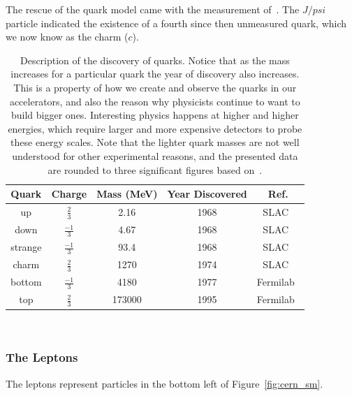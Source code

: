 The rescue of the quark model came with the measurement of~\citep{Jpsi_PhysRevLett.33.1404}.
The $J/psi$ particle indicated the existence of a fourth since then unmeasured quark, which we now know as the charm ($c$).

\begin{table}
\begin{center}
\begin{tabular}{||c c c c c||}
 \hline
 Quark & Charge & Mass (MeV) & Year Discovered & Ref.\\ [0.5ex]
 \hline\hline
 up & $\frac{2}{3}$ & 2.16 & 1968 & SLAC~\citep{1969PhRvL..23..930B, 1969PhRvL..23..935B} \\
 \hline
 down & $\frac{-1}{3}$ & 4.67 & 1968 & SLAC~\citep{1969PhRvL..23..930B, 1969PhRvL..23..935B} \\
 \hline
 strange & $\frac{-1}{3}$ & 93.4 & 1968 & SLAC~\citep{1969PhRvL..23..930B, 1969PhRvL..23..935B} \\
 \hline
 charm & $\frac{2}{3}$ & 1270 & 1974 & SLAC~\citep{Jpsi_PhysRevLett.33.1404} \\
 \hline
 bottom & $\frac{-1}{3}$ & 4180 & 1977 & Fermilab~\citep{bottom_PhysRevLett.39.252}\\
 \hline
 top & $\frac{2}{3}$ & 173000 & 1995 & Fermilab~\citep{topquark_Abachi_1995} \\
 \hline
\end{tabular}
\caption{Description of the discovery of quarks.
  Notice that as the mass increases for a particular quark the year of discovery also increases.
  This is a property of how we create and observe the quarks in our accelerators, and also the reason why physicists continue to want to build bigger ones.
  Interesting physics happens at higher and higher energies, which require larger and more expensive detectors to probe these energy scales.
  Note that the lighter quark masses are not well understood for other experimental reasons, and the presented data are rounded to three significant figures based on~\citep{Workman:2022ynf}.}
\end{center}
\end{table}
~\label{table:quark}

\subsubsection{The Leptons}

The leptons represent particles in the bottom left of Figure~\ref{fig:cern_sm}.

